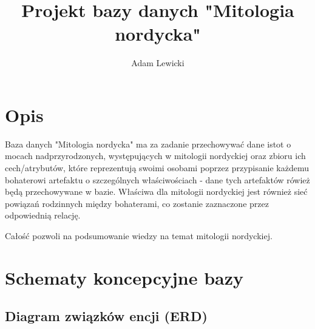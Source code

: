 \documentclass[11pt]{article}
\begin{document}
	
	\title{Projekt bazy danych "Mitologia nordycka"}
	\author{Adam Lewicki}
	\maketitle
\section{Opis}

Baza danych "Mitologia nordycka" ma za zadanie przechowywać dane istot o mocach nadprzyrodzonych, występujących w mitologii nordyckiej oraz zbioru ich cech/atrybutów, które reprezentują swoimi osobami poprzez przypisanie każdemu bohaterowi artefaktu o szczególnych właściwościach - dane tych artefaktów rówież będą przechowywane w bazie. 
Właściwa dla mitologii nordyckiej jest również sieć powiązań rodzinnych między bohaterami, co zostanie zaznaczone przez odpowiednią relację.

Całość pozwoli na podsumowanie wiedzy na temat mitologii nordyckiej.

\section{Schematy koncepcyjne bazy}
\subsection{Diagram związków encji (ERD)}
\end{document}
